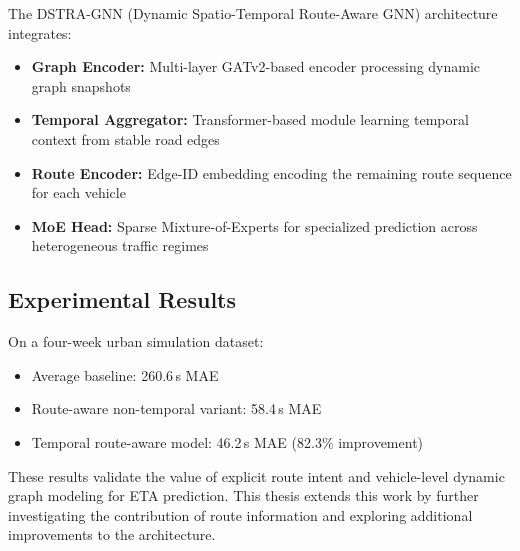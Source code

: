 The DSTRA-GNN (Dynamic Spatio-Temporal Route-Aware GNN) architecture integrates:
\begin{itemize}
    \item \textbf{Graph Encoder:} Multi-layer GATv2-based encoder processing dynamic graph snapshots
    \item \textbf{Temporal Aggregator:} Transformer-based module learning temporal context from stable road edges
    \item \textbf{Route Encoder:} Edge-ID embedding encoding the remaining route sequence for each vehicle
    \item \textbf{MoE Head:} Sparse Mixture-of-Experts for specialized prediction across heterogeneous traffic regimes
\end{itemize}

\subsection{Experimental Results}

On a four-week urban simulation dataset:
\begin{itemize}
    \item Average baseline: 260.6\,s MAE
    \item Route-aware non-temporal variant: 58.4\,s MAE
    \item Temporal route-aware model: 46.2\,s MAE (82.3\% improvement)
\end{itemize}

These results validate the value of explicit route intent and vehicle-level dynamic graph modeling for ETA prediction. This thesis extends this work by further investigating the contribution of route information and exploring additional improvements to the architecture.

